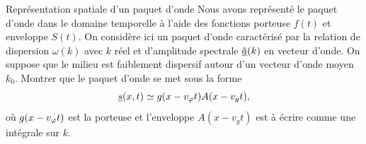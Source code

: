 \documentclass[12pt,fancy]{cours}%
\begin{document}
\begin{exemple}{Représentation spatiale d'un paquet d'onde}
  Nous avons représenté le paquet d'onde dans le domaine temporelle à l'aide des fonctions porteuse $f(t)$ et enveloppe $S(t)$.
  On considère ici un paquet d'onde caractérisé par la relation de dispersion $\omega(k)$ avec $k$ réel et d'amplitude spectrale $\tilde{\underline{a}}(k)$ en vecteur d'onde. On suppose que le milieu est faiblement dispersif autour d'un vecteur d'onde moyen $k_0$. Montrer que le paquet d'onde se met sous la forme
  \begin{equation}
    \underline{s}(x,t) \simeq g(x - v_{\varphi} t ) A(x - v_g t),
  \end{equation}
  où $g(x - v_{\varphi} t )$ est la porteuse et l'enveloppe $A(x - v_g t)$ est à écrire comme une intégrale sur $k$.
\end{exemple}
\end{document}
